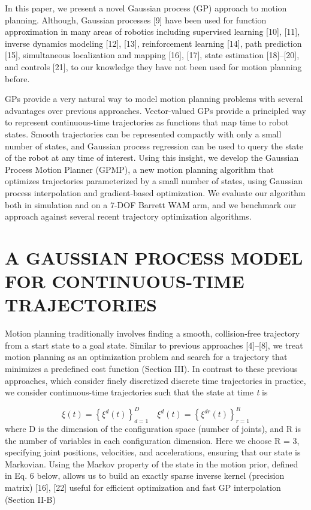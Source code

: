 \documentclass{IEEEtran}
\begin{document}
In this paper, we present a novel Gaussian process (GP)
approach to motion planning. Although, Gaussian processes
[9] have been used for function approximation in many areas
of robotics including supervised learning [10], [11], inverse
dynamics modeling [12], [13], reinforcement learning [14],
path prediction [15], simultaneous localization and mapping [16], [17], state estimation [18]–[20], and controls [21],
to our knowledge they have not been used for motion
planning before.

GPs provide a very natural way to model motion planning
problems with several advantages over previous approaches.
Vector-valued GPs provide a principled way to represent
continuous-time trajectories as functions that map time to
robot states. Smooth trajectories can be represented compactly with only a small number of states, and Gaussian
process regression can be used to query the state of the robot
at any time of interest. Using this insight, we develop the
Gaussian Process Motion Planner (GPMP), a new motion
planning algorithm that optimizes trajectories parameterized
by a small number of states, using Gaussian process interpolation and gradient-based optimization. We evaluate our
algorithm both in simulation and on a 7-DOF Barrett WAM
arm, and we benchmark our approach against several recent
trajectory optimization algorithms.

\section{A GAUSSIAN PROCESS MODEL FOR CONTINUOUS-TIME TRAJECTORIES}
Motion planning traditionally involves finding a smooth,
collision-free trajectory from a start state to a goal state.
Similar to previous approaches [4]–[8], we treat motion planning as an optimization problem and search for a trajectory
that minimizes a predefined cost function (Section III). In
contrast to these previous approaches, which consider finely
discretized discrete time trajectories in practice, we consider
continuous-time trajectories such that the state at time \emph{t} is 

\begin{equation}
\xi(t)=\left\{\xi^d(t)\right\}^D_{d=1} \quad
\xi^d(t)=\left\{\xi^{dr}(t)\right\}^R_{r=1}
\end{equation}
where D is the dimension of the configuration space (number
of joints), and R is the number of variables in each configuration dimension. Here we choose R = 3, specifying joint
positions, velocities, and accelerations, ensuring that our
state is Markovian. Using the Markov property of the state in
the motion prior, defined in Eq. 6 below, allows us to build
an exactly sparse inverse kernel (precision matrix) [16], [22]
useful for efficient optimization and fast GP interpolation
(Section II-B)
\end{document}

